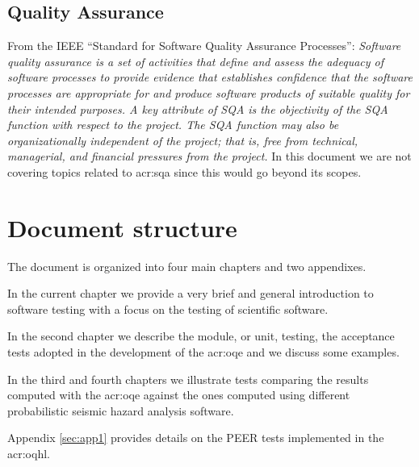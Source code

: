 \subsection{Quality Assurance}
From the IEEE ``Standard for Software Quality Assurance Processes'':
\emph{Software quality assurance is a set of activities that define and 
assess the adequacy of software processes to provide evidence that establishes 
confidence that the software processes are appropriate for and produce 
software products of suitable quality for their intended purposes. 
A key attribute of SQA is the objectivity of the SQA function with 
respect to the project. The SQA function may also be organizationally 
independent of the project; that is, free from technical, managerial, 
and financial pressures from the project.} In this document we are not 
covering topics related to \gls{acr:sqa} since this would go beyond its
scopes.
%
\section{Document structure}
The document is organized into four main chapters and two appendixes.

In the current chapter we provide a very brief and general introduction 
to software testing with a focus on the testing of scientific software. 

In the second chapter we describe the module, or unit, testing, 
the acceptance tests adopted in the development of the 
\gls{acr:oqe} and we discuss some examples.

In the third and fourth chapters we illustrate tests comparing 
the results computed with the \gls{acr:oqe} against the ones 
computed using different probabilistic seismic hazard analysis 
software.

Appendix \ref{sec:app1} provides details on the PEER tests 
implemented in the \gls{acr:oqhl}.
